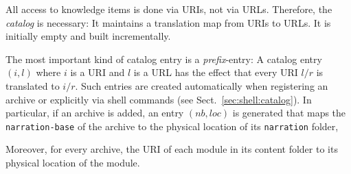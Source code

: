 All access to {\mmt} knowledge items is done via URIs, not via URLs.
Therefore, the \emph{catalog} is necessary: It maintains a translation map from URIs to URLs.
It is initially empty and built incrementally.

The most important kind of catalog entry is a \emph{prefix}-entry: A catalog entry $(i,l)$ where $i$ is a URI and $l$ is a URL has the effect that every {\mmt}  URI $l/r$ is translated to $i/r$.
Such entries are created automatically when registering an archive or explicitly via shell commands (see Sect.~\ref{sec:shell:catalog}).
In particular, if an archive is added, an entry $(nb,loc)$ is generated that maps the \texttt{narration-base} of the archive to the physical location of its \texttt{narration} folder,

Moreover, for every archive, the URI of each module in its content folder to its physical location of the module.